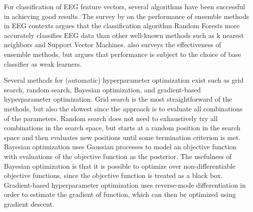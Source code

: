 For classification of EEG feature vectors, several algorithms have been successful in achieving good results. The survey by \citet{chan2015systematic} on the performance of ensemble methods in EEG contexts argues that the classification algorithm Random Forests more accurately classifies EEG data than other well-known methods such as k nearest neighbors and Support Vector Machines. \citet{sun2007experimental} also surveys the effectiveness of ensemble methods, but argues that performance is subject to the choice of base classifier as weak learners. 

Several methods for (automatic) hyperparameter optimization exist such as grid search, random search, Bayesian optimization, and gradient-based hyperparameter optimization. Grid search is the most straightforward of the methods, but also the slowest since the approach is to evaluate all combinations of the parameters. Random search does not need to exhaustively try all combinations in the search space, but starts at a random position in the search space and then evaluates new positions until some termination criterion is met. Bayesian optimization uses Gaussian processes to model an objective function with evaluations of the objective function as the posterior. The usefulness of Bayesian optimization is that it is possible to optimize over non-differentiable objective functions, since the objective function is treated as a black box. Gradient-based hyperparameter optimization uses reverse-mode differentiation in order to estimate the gradient of function, which can then be optimized using gradient descent.


